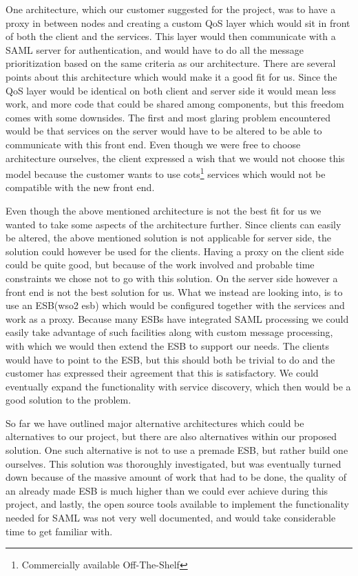         One architecture, which our customer suggested for the project, was to have a proxy in between nodes and creating a custom QoS layer which would sit in front of both the client and the services. This layer would then communicate with a SAML server for authentication, and would have to do all the message prioritization based on the same criteria as our architecture. There are several points about this architecture which would make it a good fit for us. Since the QoS layer would be identical on both client and server side it would mean less work, and more code that could be shared among components, but this freedom comes with some downsides. The first and most glaring problem encountered would be that services on the server would have to be altered to be able to communicate with this front end. Even though we were free to choose architecture ourselves, the client expressed a wish that we would not choose this model because the customer wants to use \gls{cots}\footnote{Commercially available Off-The-Shelf} services which would not be compatible with the new front end.

        Even though the above mentioned architecture is not the best fit for us we wanted to take some aspects of the architecture further. Since clients can easily be altered, the above mentioned solution is not applicable for server side, the solution could however be used for the clients. Having a proxy on the client side could be quite good, but because of the work involved and probable time constraints we chose not to go with this solution. On the server side however a front end is not the best solution for us. What we instead are looking into, is to use an ESB(\gls{wso2 esb}) which would be configured together with the services and work as a proxy. Because many ESBs have integrated SAML processing we could easily take advantage of such facilities along with custom message processing, with which we would then extend the ESB to support our needs. The clients would have to point to the ESB, but this should both be trivial to do and the customer has expressed their agreement that this is satisfactory. We could eventually expand the functionality with service discovery, which then would be a good solution to the problem.

        So far we have outlined major alternative architectures which could be alternatives to our project, but there are also alternatives within our proposed solution. One such alternative is not to use a premade ESB, but rather build one ourselves. This solution was thoroughly investigated, but was eventually turned down because of the massive amount of work that had to be done, the quality of an already made ESB is much higher than we could ever achieve during this project, and lastly, the open source tools available to implement the functionality needed for SAML was not very well documented, and would take considerable time to get familiar with.

